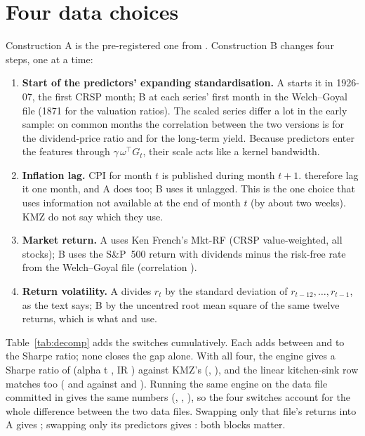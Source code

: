 \documentclass[11pt]{article}
\begin{document}
\section{Four data choices}

Construction A is the pre-registered one from \citet{thisrepo}. Construction B changes four steps, one at a
time:
\begin{enumerate}\itemsep0pt
\item[(i)] \textbf{Start of the predictors' expanding standardisation.} A starts it in 1926-07, the first CRSP
month; B at each series' first month in the Welch--Goyal file (1871 for the valuation ratios). The scaled series
differ a lot in the early sample: on common months the correlation between the two versions is \nCorrDp{} for
the dividend-price ratio and \nCorrLty{} for the long-term yield. Because predictors enter the features through
$\gamma\,\omega^{\top} G_t$, their scale acts like a kernel bandwidth.
\item[(ii)] \textbf{Inflation lag.} CPI for month $t$ is published during month $t+1$. \citet{welchgoyal2008}
therefore lag it one month, and A does too; B uses it unlagged. This is the one choice that uses information not
available at the end of month $t$ (by about two weeks). KMZ do not say which they use.
\item[(iii)] \textbf{Market return.} A uses Ken French's Mkt-RF (CRSP value-weighted, all stocks); B uses the
S\&P~500 return with dividends minus the risk-free rate from the Welch--Goyal file (correlation \nCorrRet).
\item[(iv)] \textbf{Return volatility.} A divides $r_{t}$ by the standard deviation of $r_{t-12},\dots,r_{t-1}$, as
the text says; B by the uncentred root mean square of the same twelve returns, which is what \citet{guo2026} and
\citet{rrikrv} use.
\end{enumerate}
Table~\ref{tab:decomp} adds the switches cumulatively. Each adds between \nDecStepMin{} and \nDecStepMax{} to the Sharpe ratio; none
closes the gap alone. With all four, the engine gives a Sharpe ratio of \nDecFourSR{} (alpha t \nDecFourT, IR \nDecFourIR)
against KMZ's \nKmzSR{} (\nKmzT, \nKmzIR), and the linear kitchen-sink row matches too (\nDecFourLinSR{} and
\nDecFourLinT{} against \nKmzLinSR{} and \nKmzLinT). Running the same engine on the data file committed in
\citet{rrikrv} gives the same numbers (\nExtSR, \nExtT, \nExtIR), so the four switches account for the whole
difference between the two data files. Swapping only that file's returns into A gives \nHybRetSR; swapping only its
predictors gives \nHybPredSR: both blocks matter.
\end{document}
